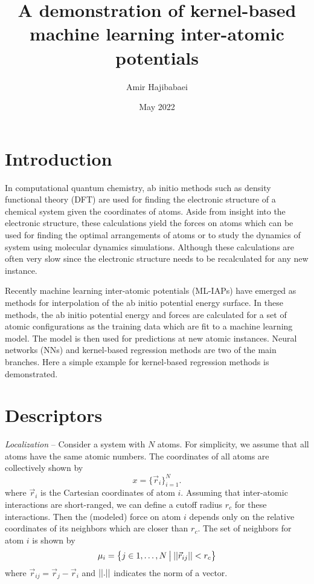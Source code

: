 \documentclass[12pt]{article}
\title{A demonstration of kernel-based
machine learning inter-atomic potentials}
\author{Amir Hajibabaei}
\date{May 2022}
\DeclarePairedDelimiter\norm{||}{||}
\newcommand{\coord}{x}
\newcommand{\neighbors}{\mu}
\newcommand{\cutoff}{r_c}
\begin{document}
\maketitle


\section{Introduction}\label{sec:introduction}

In computational quantum chemistry, ab initio methods
such as density functional theory (DFT) are used for
finding the electronic structure of a chemical system
given the coordinates of atoms.
Aside from insight into the electronic structure,
these calculations yield the forces on atoms
which can be used for finding the optimal arrangements
of atoms or to study the dynamics of system using
molecular dynamics simulations.
Although these calculations are often very slow since
the electronic structure needs to be recalculated
for any new instance.

Recently machine learning inter-atomic potentials
(ML-IAPs) have emerged as methods for interpolation
of the ab initio potential energy surface.
In these methods, the ab initio potential energy
and forces are calculated for a set of atomic
configurations as the training data which are
fit to a machine learning model.
The model is then used for predictions at new
atomic instances.
Neural networks (NNs) and kernel-based regression
methods are two of the main branches.
Here a simple example for kernel-based
regression methods is demonstrated.


\section{Descriptors}\label{sec:descriptors}

\emph{Localization} --
Consider a system with $N$ atoms.
For simplicity, we assume that all atoms have the same
atomic numbers.
The coordinates of all atoms are collectively shown by
\begin{equation}\label{eq:coord}
    \coord = \{\vec{r}_i\}_{i=1}^N
    \texttt{.}
\end{equation}
where $\vec{r}_i$ is the Cartesian coordinates of atom $i$.
Assuming that inter-atomic interactions are short-ranged,
we can define a cutoff radius $\cutoff$ for these interactions.
Then the (modeled) force on atom $i$ depends only on the
relative coordinates of its neighbors which are closer
than $\cutoff$.
The set of neighbors for atom $i$ is shown by
\begin{gather}\label{eq:neighbors}
    \neighbors_i =
            \big\{
                j \in {1, \ldots, N}
                \: \big| \:
                {\norm*{\vec{r}_{ij}} < \cutoff}
            \big\}
\end{gather}
where $\vec{r}_{ij} = \vec{r}_{j} - \vec{r}_{i}$
and $\norm{.}$ indicates the norm of a vector.
\end{document}

